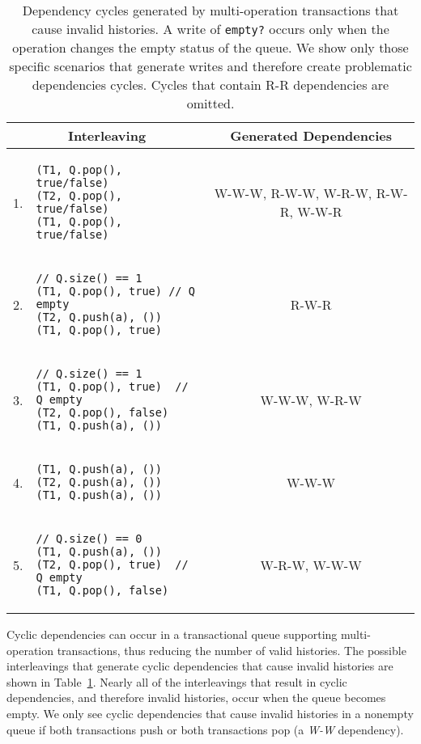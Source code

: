 \begin{table}
    \centering
    \begin{tabular}{|c|l|c|}
        \hline
\multicolumn{2}{|c|}{Interleaving} & Generated Dependencies\\
        \hline
1. & 
\begin{lstlisting}
(T1, Q.pop(), true/false)  
(T2, Q.pop(), true/false)       
(T1, Q.pop(), true/false)
\end{lstlisting} &
W-W-W, R-W-W, W-R-W, R-W-R, W-W-R 
       \\ 
    \hline
        2. & 
\begin{lstlisting}
// Q.size() == 1  
(T1, Q.pop(), true) // Q empty  
(T2, Q.push(a), ())
(T1, Q.pop(), true)
\end{lstlisting} &
R-W-R
       \\ 
    \hline
        3. & 
\begin{lstlisting}
// Q.size() == 1  
(T1, Q.pop(), true)  // Q empty  
(T2, Q.pop(), false)
(T1, Q.push(a), ())
\end{lstlisting} &
W-W-W, W-R-W
\\
\hline
        4. &
\begin{lstlisting}
(T1, Q.push(a), ()) 
(T2, Q.push(a), ())
(T1, Q.push(a), ())
\end{lstlisting} &
W-W-W
\\
\hline
        5. &
\begin{lstlisting}
// Q.size() == 0 
(T1, Q.push(a), ())       
(T2, Q.pop(), true)  // Q empty
(T1, Q.pop(), false) 
\end{lstlisting} &
W-R-W, W-W-W
\\
    \hline
\end{tabular}
    \caption[Dependency cycles generated by multi-operation transactions that cause invalid histories.]{Dependency cycles generated by multi-operation transactions that cause invalid histories. A write of \texttt{empty?} occurs only when the operation changes the empty status of the queue. We show only those specific scenarios that generate writes and therefore create problematic dependencies cycles. Cycles that contain R-R dependencies are omitted.}
    \label{tab:interleavings}
\end{table}

Cyclic dependencies can occur in a transactional queue supporting multi-operation transactions, thus reducing the number of valid histories. The possible interleavings that generate cyclic dependencies that cause invalid histories are shown in Table~\ref{tab:interleavings}. Nearly all of the interleavings that result in cyclic dependencies, and therefore invalid histories, occur when the queue becomes empty. 
We only see cyclic dependencies that cause invalid histories in a nonempty queue if both transactions push or both transactions pop (a \emph{W-W} dependency).

